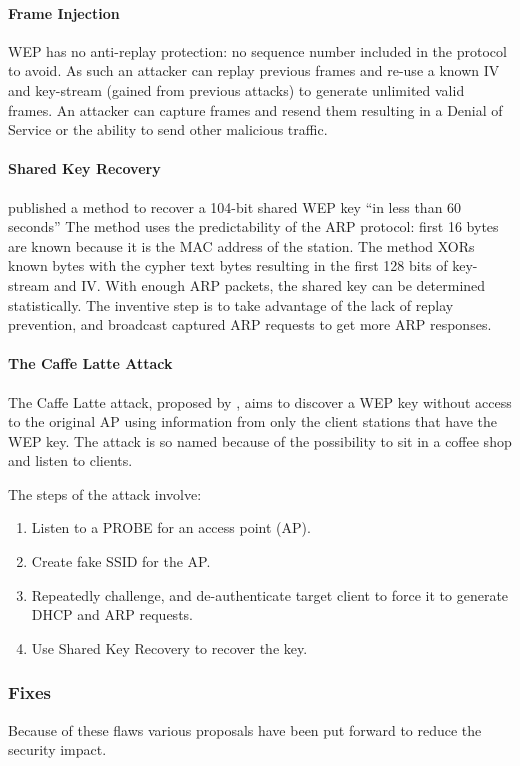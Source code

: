 \documentclass[pdftex, 11pt, a4paper]{article}
\begin{document}
\paragraph{Frame Injection}
WEP has no anti-replay protection: no sequence number included in the protocol to avoid. As such an attacker can replay previous frames and re-use a known IV and key-stream (gained from previous attacks) to generate unlimited valid frames.  An attacker can capture frames and resend them resulting in a Denial of Service or the ability to send other malicious traffic.

\paragraph{Shared Key Recovery}
\textcite{tews2007breaking} published a method to recover a 104-bit shared WEP key ``in less than 60 seconds''  The method uses the predictability of the ARP protocol: first 16 bytes are known because it is the MAC address of the station.
The method XORs known bytes with the cypher text bytes resulting in the first 128 bits of key-stream and IV. With enough ARP packets, the shared key can be determined statistically.
The inventive step is to take advantage of the lack of replay prevention, and broadcast captured ARP requests to get more ARP responses.

\paragraph{The Caffe Latte Attack}
The Caffe Latte attack, proposed by \textcite{cafe}, aims to discover a WEP key without access to the original AP using information from only the client stations that have the WEP key. The attack is so named because of the possibility to sit in a coffee shop and listen to clients.

The steps of the attack involve:
\begin{enumerate}
    \item Listen to a PROBE for an access point (AP).
    \item Create fake SSID for the AP.
    \item Repeatedly challenge, and de-authenticate target client to force it to generate DHCP and ARP requests.
    \item Use Shared Key Recovery to recover the key.
\end{enumerate}

\subsubsection{Fixes}
Because of these flaws various proposals have been put forward to reduce the security impact.
\end{document}
